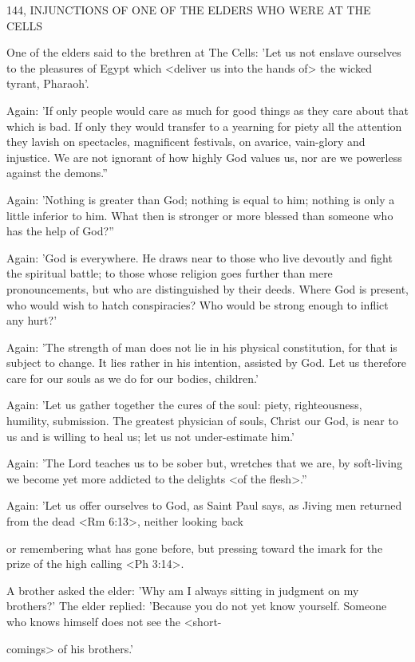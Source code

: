 144, INJUNCTIONS OF ONE OF THE ELDERS
WHO WERE AT THE CELLS

One of the elders said to the brethren at The Cells: 'Let us not
enslave ourselves to the pleasures of Egypt which <deliver us into
the hands of> the wicked tyrant, Pharaoh'.

Again: 'If only people would care as much for good things as
they care about that which is bad. If only they would transfer to a
yearning for piety all the attention they lavish on spectacles,
magnificent festivals, on avarice, vain-glory and injustice. We are
not ignorant of how highly God values us, nor are we powerless
against the demons.”

Again: 'Nothing is greater than God; nothing is equal to him;
nothing is only a little inferior to him. What then is stronger or
more blessed than someone who has the help of God?”

Again: 'God is everywhere. He draws near to those who live
devoutly and fight the spiritual battle; to those whose religion goes
further than mere pronouncements, but who are distinguished by
their deeds. Where God is present, who would wish to hatch
conspiracies? Who would be strong enough to inflict any hurt?'

Again: 'The strength of man does not lie in his physical
constitution, for that is subject to change. It lies rather in his
intention, assisted by God. Let us therefore care for our souls as we
do for our bodies, children.'

Again: 'Let us gather together the cures of the soul: piety,
righteousness, humility, submission. The greatest physician of souls,
Christ our God, is near to us and is willing to heal us; let us not
under-estimate him.'

Again: 'The Lord teaches us to be sober but, wretches that we
are, by soft-living we become yet more addicted to the delights <of
the flesh>.”

Again: 'Let us offer ourselves to God, as Saint Paul says, as
Jiving men returned from the dead <Rm 6:13>, neither looking back

or remembering what has gone before, but pressing toward the
imark for the prize of the high calling <Ph 3:14>.

A brother asked the elder: 'Why am I always sitting in judgment
on my brothers?' The elder replied: 'Because you do not yet know
yourself. Someone who knows himself does not see the <short-

comings> of his brothers.'

